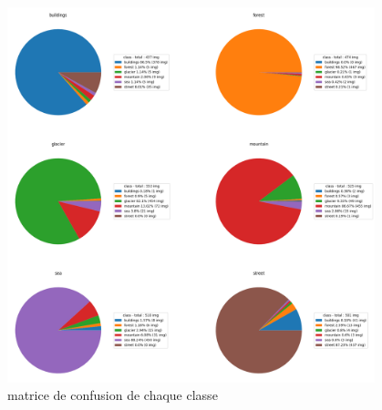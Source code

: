 \documentclass[12pt ,a4paper ]{article}
\begin{document}
\begin{figure}[h]
    \begin{center}
        \includegraphics[width=0.95\textwidth]{./img/pie_diagram.png}
    \end{center}
    \caption{matrice de confusion de chaque classe}
\end{figure}
\end{document}
